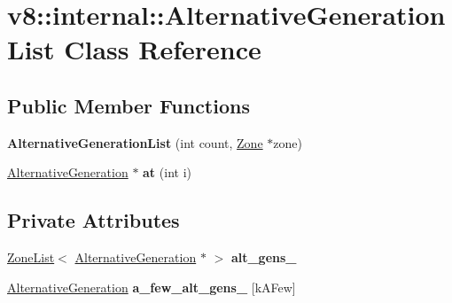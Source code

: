 \hypertarget{classv8_1_1internal_1_1_alternative_generation_list}{}\section{v8\+:\+:internal\+:\+:Alternative\+Generation\+List Class Reference}
\label{classv8_1_1internal_1_1_alternative_generation_list}
\subsection*{Public Member Functions}
\begin{DoxyCompactItemize}
\item 
{\bfseries Alternative\+Generation\+List} (int count, \hyperlink{classv8_1_1internal_1_1_zone}{Zone} $\ast$zone)\hypertarget{classv8_1_1internal_1_1_alternative_generation_list_a12e31ade267f3b97c25bf9201fe3b65a}{}\label{classv8_1_1internal_1_1_alternative_generation_list_a12e31ade267f3b97c25bf9201fe3b65a}

\item 
\hyperlink{classv8_1_1internal_1_1_alternative_generation}{Alternative\+Generation} $\ast$ {\bfseries at} (int i)\hypertarget{classv8_1_1internal_1_1_alternative_generation_list_a074eac77994a3714b4214b777fce5b2a}{}\label{classv8_1_1internal_1_1_alternative_generation_list_a074eac77994a3714b4214b777fce5b2a}

\end{DoxyCompactItemize}
\subsection*{Private Attributes}
\begin{DoxyCompactItemize}
\item 
\hyperlink{classv8_1_1internal_1_1_zone_list}{Zone\+List}$<$ \hyperlink{classv8_1_1internal_1_1_alternative_generation}{Alternative\+Generation} $\ast$ $>$ {\bfseries alt\+\_\+gens\+\_\+}\hypertarget{classv8_1_1internal_1_1_alternative_generation_list_af6fd3dd431e003ed0bc03213b62f7004}{}\label{classv8_1_1internal_1_1_alternative_generation_list_af6fd3dd431e003ed0bc03213b62f7004}

\item 
\hyperlink{classv8_1_1internal_1_1_alternative_generation}{Alternative\+Generation} {\bfseries a\+\_\+few\+\_\+alt\+\_\+gens\+\_\+} \mbox{[}k\+A\+Few\mbox{]}\hypertarget{classv8_1_1internal_1_1_alternative_generation_list_a053e7a2deb11d3e4904f3ad551297532}{}\label{classv8_1_1internal_1_1_alternative_generation_list_a053e7a2deb11d3e4904f3ad551297532}

\end{DoxyCompactItemize}
